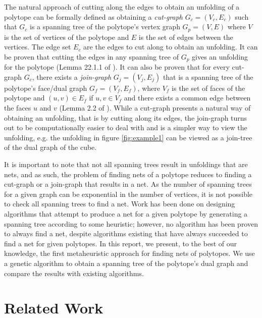 \documentclass[conference]{IEEEtran}
\begin{document}
The natural approach of cutting along the edges to obtain an unfolding of a polytope can be formally defined as obtaining a \emph{cut-graph} $G_c = (V_c, E_c)$ such that $G_c$ is a spanning tree of the polytope's vertex graph $G_p = (V, E)$ where $V$ is the set of vertices of the polytope and $E$ is the set of edges between the vertices. The edge set $E_c$ are the edges to cut along to obtain an unfolding. It can be proven that cutting the edges in any spanning tree of $G_p$ gives an unfolding for the polytope (Lemma 22.1.1 of \cite{demaineGeometricFoldingAlgorithms2007}). It can also be proven that for every cut-graph $G_c$, there exists a \emph{join-graph} $G_j = (V_j, E_j)$ that is a spanning tree of the polytope's face/dual graph $G_f = (V_f, E_f)$, where $V_f$ is the set of faces of the polytope and $(u, v) \in E_f$ if $u, v \in V_f$ and there exists a common edge between the faces $u$ and $v$ (Lemma 2.2 of \cite{schlickenriederNetsPolyhedra}). While a cut-graph presents a natural way of obtaining an unfolding, that is by cutting along its edges, the join-graph turns out to be computationally easier to deal with and is a simpler way to view the unfolding, e.g. the unfolding in figure \ref{fig:example1} can be viewed as a join-tree of the dual graph of the cube. 

It is important to note that not all spanning trees result in unfoldings that are nets, and as such, the problem of finding nets of a polytope reduces to finding a cut-graph or a join-graph that results in a net. As the number of spanning trees for a given graph can be exponential in the number of vertices, it is not possible to check all spanning trees to find a net. Work has been done on designing algorithms that attempt to produce a net for a given polytope by generating a spanning tree according to some heuristic; however, no algorithm has been proven to always find a net, despite algorithms existing that have always succeeded to find a net for given polytopes. In this report, we present, to the best of our knowledge, the first metaheuristic approach for finding nets of polytopes. We use a genetic algorithm to obtain a spanning tree of the polytope's dual graph and compare the results with existing algorithms. 

\section{Related Work}
\end{document}

